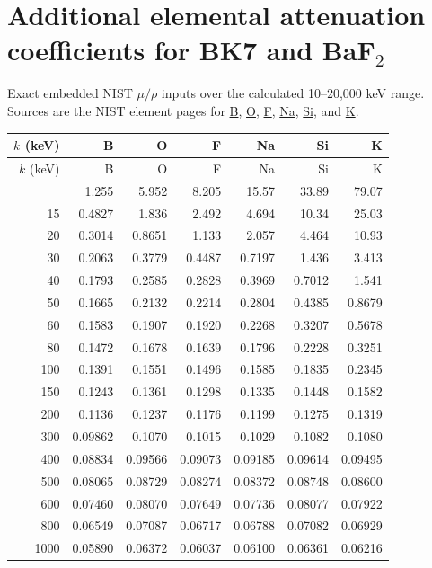 \documentclass[10pt,a4paper]{article}
\begin{document}
\section{Additional elemental attenuation coefficients for BK7 and BaF$_2$}
Exact embedded NIST $\mu/\rho$ inputs over the calculated 10--20,000 keV range. Sources are the NIST element pages for \href{https://physics.nist.gov/PhysRefData/XrayMassCoef/ElemTab/z05.html}{B}, \href{https://physics.nist.gov/PhysRefData/XrayMassCoef/ElemTab/z08.html}{O}, \href{https://physics.nist.gov/PhysRefData/XrayMassCoef/ElemTab/z09.html}{F}, \href{https://physics.nist.gov/PhysRefData/XrayMassCoef/ElemTab/z11.html}{Na}, \href{https://physics.nist.gov/PhysRefData/XrayMassCoef/ElemTab/z14.html}{Si}, and \href{https://physics.nist.gov/PhysRefData/XrayMassCoef/ElemTab/z19.html}{K}.
\scriptsize
\begin{longtable}{rrrrrrr}
\toprule
$k$ (keV)&B&O&F&Na&Si&K\\
\midrule\endfirsthead
\toprule $k$ (keV)&B&O&F&Na&Si&K\\\midrule\endhead
\bottomrule\endfoot
10&1.255&5.952&8.205&15.57&33.89&79.07\\
15&0.4827&1.836&2.492&4.694&10.34&25.03\\
20&0.3014&0.8651&1.133&2.057&4.464&10.93\\
30&0.2063&0.3779&0.4487&0.7197&1.436&3.413\\
40&0.1793&0.2585&0.2828&0.3969&0.7012&1.541\\
50&0.1665&0.2132&0.2214&0.2804&0.4385&0.8679\\
60&0.1583&0.1907&0.1920&0.2268&0.3207&0.5678\\
80&0.1472&0.1678&0.1639&0.1796&0.2228&0.3251\\
100&0.1391&0.1551&0.1496&0.1585&0.1835&0.2345\\
150&0.1243&0.1361&0.1298&0.1335&0.1448&0.1582\\
200&0.1136&0.1237&0.1176&0.1199&0.1275&0.1319\\
300&0.09862&0.1070&0.1015&0.1029&0.1082&0.1080\\
400&0.08834&0.09566&0.09073&0.09185&0.09614&0.09495\\
500&0.08065&0.08729&0.08274&0.08372&0.08748&0.08600\\
600&0.07460&0.08070&0.07649&0.07736&0.08077&0.07922\\
800&0.06549&0.07087&0.06717&0.06788&0.07082&0.06929\\
1000&0.05890&0.06372&0.06037&0.06100&0.06361&0.06216\\

\end{longtable}
\end{document}
